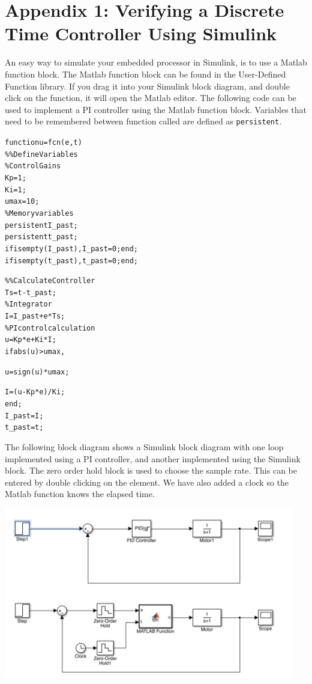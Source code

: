 \section{Appendix 1: Verifying a Discrete Time Controller Using Simulink}

An easy way to simulate your embedded processor in Simulink, is to use a Matlab function block.  The Matlab function block can be found in the User-Defined Function library. If you drag it into your Simulink block diagram, and double click on the function, it will open the Matlab editor. The following code can be used to implement a PI controller using the Matlab function block. Variables that need to be remembered between function called are defined as \texttt{persistent}.
\begin{alltt}
function u = fcn(e,t)
\%\% Define Variables
\% Control Gains
Kp=1;
Ki=1;
umax = 10;
\% Memory variables
persistent I_past;
persistent t_past;
if isempty(I_past), I_past=0; end;
if isempty(t_past), t_past=0; end;

\%\% Calculate Controller
Ts = t - t_past;
\% Integrator
I = I_past+e*Ts;
\% PI control calculation
u = Kp*e+Ki*I;
if abs(u)>umax,
\rule{0pt}{0pt}\hspace{.1in}u = sign(u)*umax;
\rule{0pt}{0pt}\hspace{.1in}I = (u-Kp*e)/Ki;
end;
I_past=I;
t_past=t;
\end{alltt}

The following block diagram shows a Simulink block diagram with one loop implemented using a PI controller, and another implemented using the Simulink block. The zero order hold block is used to choose the sample rate. This can be entered by double clicking on the element. We have also added a clock so the Matlab function knows the elapsed time.

\begin{center}
\includegraphics[width=5in]{figures/control_implementation}

\end{center}

